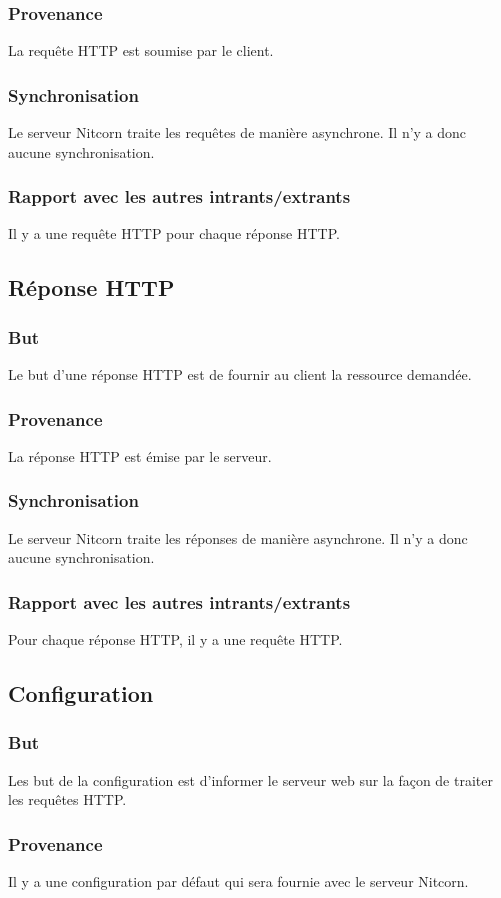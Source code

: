 \documentclass{scrreprt}
\begin{document}
\subsubsection{Provenance} La requête HTTP est soumise par le client.
\subsubsection{Synchronisation} Le serveur Nitcorn traite les requêtes de manière asynchrone. Il n'y a donc aucune synchronisation.
\subsubsection{Rapport avec les autres intrants/extrants} Il y a une requête HTTP pour chaque réponse HTTP.
\subsection{Réponse HTTP}
\subsubsection{But} Le but d'une réponse HTTP est de fournir au client la ressource demandée.
\subsubsection{Provenance} La réponse HTTP est émise par le serveur.
\subsubsection{Synchronisation} Le serveur Nitcorn traite les réponses de manière asynchrone. Il n'y a donc aucune synchronisation.
\subsubsection{Rapport avec les autres intrants/extrants} Pour chaque réponse HTTP, il y a une requête HTTP.
\subsection{Configuration}
\subsubsection{But} Les but de la configuration est d'informer le serveur web sur la façon de traiter les requêtes HTTP.
\subsubsection{Provenance} Il y a une configuration par défaut qui sera fournie avec le serveur Nitcorn. 
\end{document}
